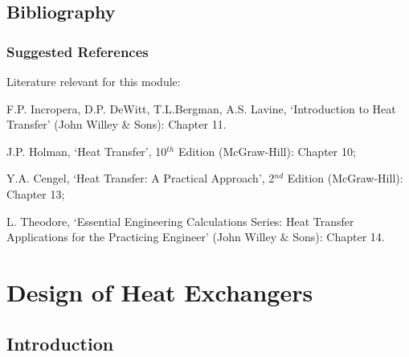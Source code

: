 \documentclass[10pt,compress]{beamer}
\begin{document}
\subsection{Bibliography} 

\begin{frame}
 \frametitle{Suggested References}
  Literature relevant for this module:
  \begin{enumerate}[{[}1{]}]
    \item F.P. Incropera, D.P. DeWitt, T.L.Bergman, A.S. Lavine, `Introduction to Heat Transfer' (John Willey $\&$ Sons): Chapter 11.
    \item J.P. Holman, `Heat Transfer', 10$^{th}$ Edition (McGraw-Hill): Chapter 10;
    \item Y.A. Cengel, `Heat Transfer: A Practical Approach', 2$^{nd}$ Edition (McGraw-Hill): Chapter 13;
    \item L. Theodore, `Essential Engineering Calculations Series: Heat Transfer Applications for the Practicing Engineer' (John Willey $\&$ Sons): Chapter 14.
  \end{enumerate}
\end{frame}

\section{Design of Heat Exchangers}

\subsection{Introduction}
\end{document}
